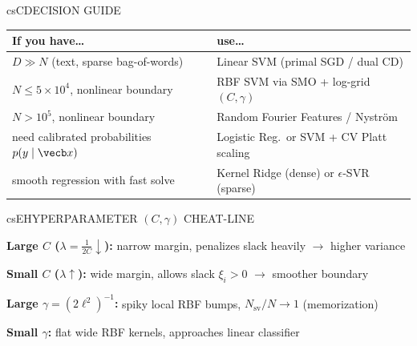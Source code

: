 \documentclass[../../../../master.tex]{subfiles}
\begin{document}
\begin{cscolumns}
\begin{cscard}{csC}{DECISION GUIDE}
  \renewcommand{\arraystretch}{1.22}\small
  \begin{tabular}{@{}>{\raggedright\arraybackslash}p{3.2cm}>{\raggedright\arraybackslash}p{4.6cm}@{}}
    \textbf{If you have\ldots} & \textbf{use\ldots}\\ \hline
    $D\gg N$ (text, sparse bag-of-words) & Linear SVM (primal SGD / dual CD)\\
    $N\le 5\times 10^4$, nonlinear boundary & RBF SVM via SMO + log-grid $(C,\gamma)$\\
    $N>10^5$, nonlinear boundary & Random Fourier Features / Nystr\"om\\
    need calibrated probabilities $p(y\mid\vecb x)$ & Logistic Reg.\ or SVM + CV Platt scaling\\
    smooth regression with fast solve & Kernel Ridge (dense) or $\epsilon$-SVR (sparse)\\
  \end{tabular}
\end{cscard}

\begin{cscard}{csE}{HYPERPARAMETER $(C,\gamma)$ CHEAT-LINE}
  \begin{csbul}
    \item \textbf{Large $C$ ($\lambda=\frac{1}{2C}\downarrow$):} narrow margin, penalizes slack heavily $\to$ higher variance
    \item \textbf{Small $C$ ($\lambda\uparrow$):} wide margin, allows slack $\xi_i>0$ $\to$ smoother boundary
    \item \textbf{Large $\gamma=(2\ell^2)^{-1}$:} spiky local RBF bumps, $N_{\mathrm{sv}}/N\to 1$ (memorization)
    \item \textbf{Small $\gamma$:} flat wide RBF kernels, approaches linear classifier
  \end{csbul}
\end{cscard}


\end{cscolumns}
\end{document}
